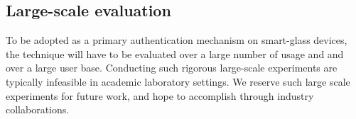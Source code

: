 \subsection{Large-scale evaluation}
To be adopted as a primary authentication mechanism on smart-glass devices,
the technique will have to be evaluated over a large number of usage and
and over a large user base. Conducting such rigorous large-scale experiments
are typically infeasible in academic laboratory settings. We reserve such
large scale experiments for future work, and hope to accomplish through
industry collaborations.
